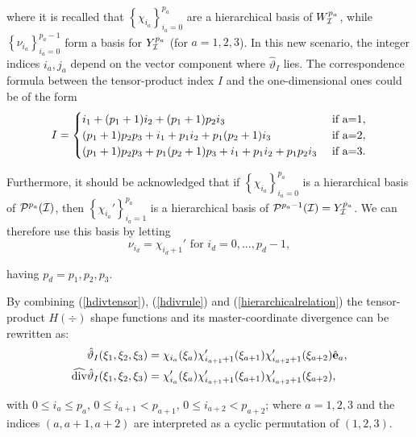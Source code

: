 \noindent where it is recalled that $\left\{\chi_{i_a}\right\}_{i_a=0}^{p_a}$ are a hierarchical basis of $W^{p_a}_{\mathcal{I}}$, while $\left\{\nu_{i_a}\right\}_{i_a=0}^{p_a-1}$ form a basis for $Y^{p_a}_{\mathcal{I}}$ (for $a=1,2,3$). In this new scenario, the integer indices $i_a,j_a$ depend on the vector component where $\hat{\vartheta}_I$ lies. The correspondence formula between the tensor-product index $I$ and the one-dimensional ones could be of the form
\begin{equation}
    I=  \begin{cases}
            i_1+(p_1+1)i_2+(p_1+1)p_2i_3 & \text{ if }$a=1$,\\
            (p_1+1)p_2p_3+i_1+p_1i_2+p_1(p_2+1)i_3 & \text{ if }$a=2$,\\
            (p_1+1)p_2p_3+p_1(p_2+1)p_3+i_1+p_1i_2+p_1p_2i_3 & \text{ if }$a=3$.
        \end{cases}
        \label{hdivtensorindex}
\end{equation}

Furthermore, it should be acknowledged that if $\left\{\chi_{i_a}\right\}_{i_a=0}^{p_a}$ is a hierarchical basis of $\mathcal{P}^{p_a}(\mathcal{I})$, then $\left\{\chi_{i_a}'\right\}_{i_a=1}^{p_a}$ is a hierarchical basis of $\mathcal{P}^{p_a-1}(\mathcal{I})=Y^{p_a}_{\mathcal{I}}$. We can therefore use this basis by letting 
\begin{equation}
    \nu_{i_d}=\chi_{i_d+1}'\text{ for }i_d=0,...,p_d-1,
    \label{hierarchicalrelation}
\end{equation}

\noindent having $p_d=p_1,p_2,p_3$.

By combining (\ref{hdivtensor}), (\ref{hdivrule}) and (\ref{hierarchicalrelation}) the tensor-product $H(\div)$ shape functions and its master-coordinate divergence can be rewritten as:
\begin{align}
    \hat{\vartheta}_I(\xi_1,\xi_2,\xi_3)&= \chi_{i_a}(\xi_a)\chi_{i_{a+1}+1}'(\xi_{a+1})\chi_{i_{a+2}+1}'(\xi_{a+2})\hat{\mathbf{e}}_a,\label{divtensor0}\\
    \widehat{\operatorname{div}}\hat{\vartheta}_I(\xi_1,\xi_2,\xi_3)&= \chi_{i_a}'(\xi_a)\chi_{i_{a+1}+1}'(\xi_{a+1})\chi_{i_{a+2}+1}'(\xi_{a+2})
    ,\label{divtensor1}
\end{align}

\noindent with $0\leq i_a\leq p_a$, $0\leq i_{a+1}<p_{a+1}$, $0\leq i_{a+2}<p_{a+2}$; where $a=1,2,3$ and the indices $(a,a+1,a+2)$ are interpreted as a cyclic permutation of $(1,2,3)$.


